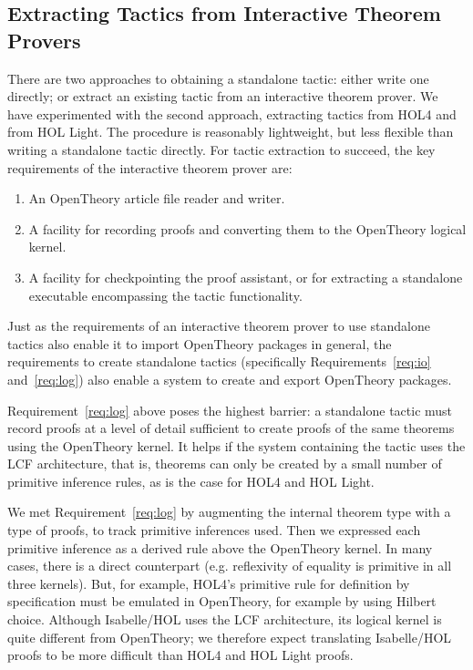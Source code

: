 \documentclass{llncs}
\newcommand{\OpenTheory}{OpenTheory\xspace}
\newcommand{\eg}{e.g.\xspace}
\begin{document}
\subsection{Extracting Tactics from Interactive Theorem Provers}

There are two approaches to obtaining a standalone tactic: either write one directly; or extract an existing tactic from an interactive theorem prover.
We have experimented with the second approach, extracting tactics from HOL4 and from HOL Light.
The procedure is reasonably lightweight, but less flexible than writing a standalone tactic directly.
For tactic extraction to succeed, the key requirements of the interactive theorem prover are:
\begin{enumerate}
\item\label{req:io} An \OpenTheory article file reader and writer.

\item\label{req:log} A facility for recording proofs and converting them to the \OpenTheory logical kernel.

\item\label{req:ckpt} A facility for checkpointing the proof assistant, or for extracting a standalone executable encompassing the tactic functionality.
\end{enumerate}

Just as the requirements of an interactive theorem prover to use standalone tactics also enable it to import \OpenTheory packages in general, the requirements to create standalone tactics (specifically Requirements~\ref{req:io} and~\ref{req:log}) also enable a system to create and export \OpenTheory packages.

Requirement~\ref{req:log} above poses the highest barrier: a standalone tactic must record proofs at a level of detail sufficient to create proofs of the same theorems using the \OpenTheory kernel.
It helps if the system containing the tactic uses the LCF architecture, that is, theorems can only be created by a small number of primitive inference rules, as is the case for HOL4 and HOL Light.

We met Requirement~\ref{req:log} by augmenting the internal theorem type with a type of proofs, to track primitive inferences used.
Then we expressed each primitive inference as a derived rule above the \OpenTheory kernel.
In many cases, there is a direct counterpart (\eg reflexivity of equality is primitive in all three kernels).
But, for example, HOL4's primitive rule for definition by specification must be emulated in \OpenTheory, for example by using Hilbert choice.
Although Isabelle/HOL uses the LCF architecture, its logical kernel is quite different from \OpenTheory; we therefore expect translating Isabelle/HOL proofs to be more difficult than HOL4 and HOL Light proofs.
\end{document}
